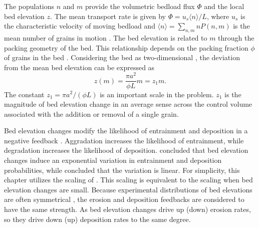 The populations $n$ and $m$ provide the volumetric bedload flux $\Phi$ and the local bed elevation $z$.
The mean transport rate is given by $\Phi = u_s\langle n \rangle/L$, where $u_s$ is the characteristic velocity of moving bedload and $\langle n \rangle = 
\sum_{n,m}nP(n,m) $ is the mean number of grains in motion \citep{Charru2004, Ancey2008, Furbish2012a}.
The bed elevation is related to $m$ through the packing geometry of the bed.
This relationship depends on the packing fraction $\phi$ of grains in the bed \citep{Bennett1972}. Considering the bed as two-dimensional \citep{Einstein1950, Paintal1971}, the deviation from the mean bed elevation can be expressed as
\begin{equation} z(m) = \frac{\pi a^2}{\phi L}m = z_1 m. \label{eq:ele}\end{equation}
The constant $z_1 = \pi a^2/(\phi L)$ is an important scale in the problem. 
$z_1$ is the magnitude of bed elevation change in an average sense across the control volume associated with the addition or removal of a single grain.

Bed elevation changes modify the likelihood of entrainment and deposition in a negative feedback \citep{Sawai1987, Wong2007}. Aggradation increases the likelihood of entrainment, while degradation increases the likelihood of deposition.
\citet{Wong2007} concluded that bed elevation changes induce an exponential variation in entrainment and deposition probabilities, while \citet{Sawai1987} concluded that the variation is linear.
For simplicity, this chapter utilizes the scaling of \citet{Sawai1987}. This scaling is equivalent to the  \citet{Wong2007} scaling when bed elevation changes are small.
Because experimental distributions of bed elevations are often symmetrical \citep[e.g.][]{Crickmore1962, Pender2001,Wong2007, Martin2014}, the erosion and deposition feedbacks are considered to have the same strength.
As bed elevation changes drive up (down) erosion rates, so they drive down (up) deposition rates to the same degree.

